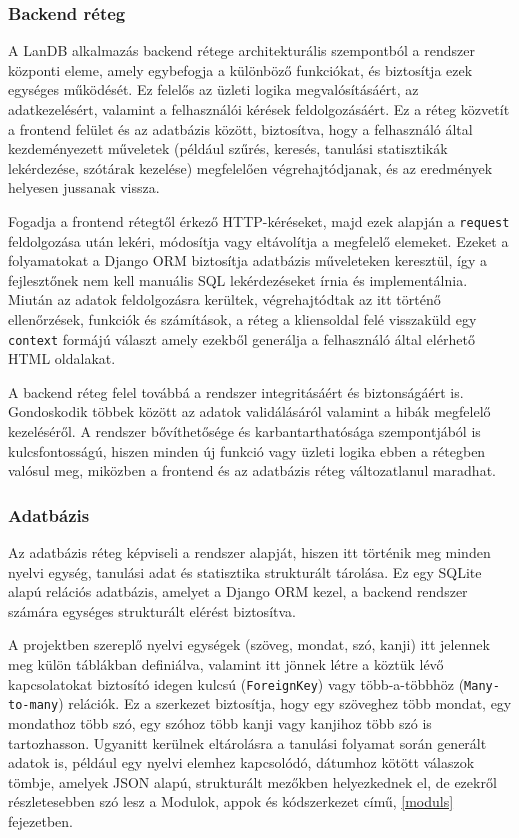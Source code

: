 \subsubsection{Backend réteg}

A LanDB alkalmazás backend rétege architekturális szempontból a rendszer központi eleme, amely egybefogja a különböző funkciókat, és biztosítja ezek egységes működését. Ez felelős az üzleti logika megvalósításáért, az adatkezelésért, valamint a felhasználói kérések feldolgozásáért. Ez a réteg közvetít a frontend felület és az adatbázis között, biztosítva, hogy a felhasználó által kezdeményezett műveletek (például szűrés, keresés, tanulási statisztikák lekérdezése, szótárak kezelése) megfelelően végrehajtódjanak, és az eredmények helyesen jussanak vissza. 

Fogadja a frontend rétegtől érkező HTTP-kéréseket, majd ezek alapján a \texttt{request} feldolgozása után lekéri, módosítja vagy eltávolítja a megfelelő elemeket. Ezeket a folyamatokat a Django ORM biztosítja adatbázis műveleteken keresztül, így a fejlesztőnek nem kell manuális SQL lekérdezéseket írnia és implementálnia.  Miután az adatok feldolgozásra kerültek, végrehajtódtak az itt történő ellenőrzések, funkciók és számítások, a réteg a kliensoldal felé visszaküld egy \texttt{context} formájú választ amely ezekből generálja a felhasználó által elérhető HTML oldalakat.

A backend réteg felel továbbá a rendszer integritásáért és biztonságáért is. Gondoskodik többek között az adatok validálásáról valamint a hibák megfelelő kezeléséről. A rendszer bővíthetősége és karbantarthatósága szempontjából is kulcsfontosságú, hiszen minden új funkció vagy üzleti logika ebben a rétegben valósul meg, miközben a frontend és az adatbázis réteg változatlanul maradhat.

\subsubsection{Adatbázis}

Az adatbázis réteg képviseli a rendszer alapját, hiszen itt történik meg minden nyelvi egység, tanulási adat és statisztika strukturált tárolása. Ez egy SQLite alapú relációs adatbázis, amelyet a Django ORM kezel, a backend rendszer számára egységes strukturált elérést biztosítva. 

A projektben szereplő nyelvi egységek (szöveg, mondat, szó, kanji) itt jelennek meg külön táblákban definiálva, valamint itt jönnek létre a köztük lévő kapcsolatokat biztosító idegen kulcsú (\texttt{ForeignKey}) vagy több-a-többhöz (\texttt{Many-to-many}) relációk. Ez a szerkezet biztosítja, hogy egy szöveghez több mondat, egy mondathoz több szó, egy szóhoz több kanji vagy kanjihoz több szó is tartozhasson. Ugyanitt kerülnek eltárolásra a tanulási folyamat során generált adatok is, például egy nyelvi elemhez kapcsolódó, dátumhoz kötött válaszok tömbje, amelyek JSON alapú, strukturált mezőkben helyezkednek el, de ezekről részletesebben szó lesz a Modulok, appok és kódszerkezet című, \ref{moduls} fejezetben.

